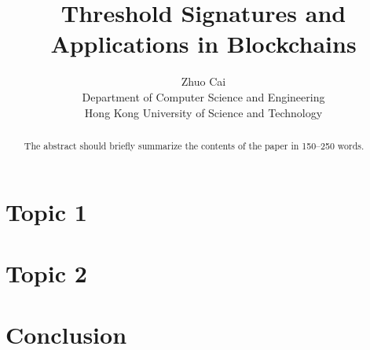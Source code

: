 \documentclass[11pt]{article}
\newtheorem{theorem}{Theorem}[section]
\begin{document}
%
\title{Threshold Signatures and Applications in Blockchains}
%
%
\author{Zhuo Cai\\Department of Computer Science and Engineering\\Hong Kong University of Science and Technology}
%
%
%
\maketitle              %
%
\begin{abstract}
The abstract should briefly summarize the contents of the paper in
150--250 words.
\end{abstract}
%
%
\newpage
\tableofcontents

\newpage


\newpage


\newpage


\newpage


\newpage


\newpage
\section{Topic 1}


\newpage
\section{Topic 2}


\newpage
\section{Conclusion}




\newpage



\end{document}
